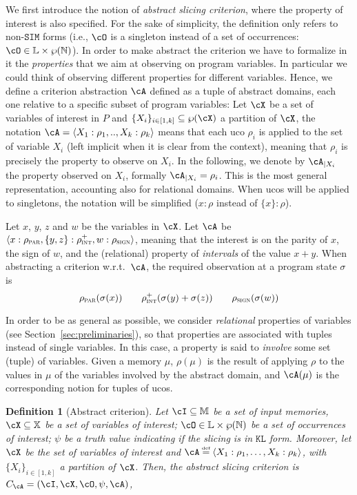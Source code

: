 \documentclass[prodmode,acmtocl]{acmsmall}
\newcommand{\caX}{\cX}
\def\prog{\ensuremath{P}\xspace}
\def\state{\ensuremath{\sigma}\xspace}
\def\variables{\ensuremath{\mathbb{X}}\xspace}
\def\memory{\ensuremath{\mu}\xspace}
\def\memories{\ensuremath{\mathbb{M}}\xspace}
\def\lnums{\ensuremath{\mathbb{L}}\xspace}
\def\crit{\ensuremath{C}\xspace}
\def\uco{\ensuremath{\rho}\xspace}
\def\KL{\ensuremath{\mathtt{KL}}\xspace}
\def\SIM{\ensuremath{\mathtt{SIM}}\xspace}
\def\defi{\mbox{\raisebox{0ex}[1ex][1ex]{$\stackrel{\mbox{\tiny
def}}{\; =\;}$}}}
\def\tuple#1{\langle #1 \rangle}
\newcommand{\0}{\mbox{\bf 0}}
\newtheorem{mydefinition}[theorem]{Definition}
\def\NATURALS{\mathbb{N}}
\def\PARDOM{\ensuremath{\uco_{\textsc{par}}}\xspace}
\def\INTDOM{\ensuremath{\uco_{\textsc{int}}}\xspace}
\def\SIGNDOM{\ensuremath{\uco_{\textsc{sign}}}\xspace}
\begin{document}
We first introduce the notion of \emph{abstract slicing criterion},
where the property of interest is also specified.  For the sake of
simplicity, the definition only refers to non-$\SIM$ forms (i.e.,
$\cO$ is a singleton instead of a set of occurrences: $\cO \in \lnums
\times \wp(\NATURALS)$). In order to make abstract the criterion we
have to formalize in it the {\em properties} that we aim at observing
on program variables. In particular we could think of observing
different properties for different variables.  Hence, we define a
criterion abstraction $\cA$ defined as a tuple of abstract domains,
each one relative to a specific subset of program variables: Let $\cX$
be a set of variables of interest in $\prog$ and
$\{X_i\}_{i\in[1,k]}\subseteq\wp(\cX)$
a partition of $\cX$, the notation $\cA = \tuple{X_1: \uco_1,..,X_k:
  \uco_k}$ means that each uco $\uco_i$ is applied to the set of
variable $X_i$ (left implicit when it is clear from the context),
meaning that $\uco_i$ is precisely the property to observe on
$X_i$. In the following, we denote by $\cA_{|X_i}$ the property
observed on $X_i$, formally $\cA_{|X_i}=\uco_i$.
This is the most general representation, accounting also for
relational domains. When ucos will be applied to singletons, the
notation will be simplified ($x:\uco$ instead of $\{x\}:\uco$).

\begin{example}
  Let $x$, $y$, $z$ and $w$ be the variables in $\cX$.  Let $\cA$ be
  $\tuple{x:\PARDOM,\{y,z\}:\INTDOM^+,w:\SIGNDOM}$, meaning that the
  interest is on the parity of $x$, the sign of $w$, and the
  (relational) property of \emph{intervals} \cite{CC79} of the value
  $x+y$.  When abstracting a criterion w.r.t.~$\cA$, the required
  observation at a program state $\state$ is
  \[\PARDOM(\state(x)) \qquad 
  \INTDOM^+(\state(y)+\state(z)) \qquad \SIGNDOM(\state(w)) \]
\end{example}

In order to be as general as possible, we consider \emph{relational}
properties of variables (see Section~\ref{sec:preliminaries}), so that
properties are associated with tuples instead of single variables.  In
this case, a property is said to \emph{involve} some set (tuple) of
variables.  Given a memory $\memory$, $\uco(\memory)$ is the result of
applying $\uco$ to the values in $\memory$ of the variables involved
by the abstract domain, and $\cA(\memory)$ is the corresponding notion
for tuples of ucos.

\begin{mydefinition}[Abstract criterion]
  \label{def:AbstractCriteria} Let $\cI \subseteq \memories$ be a set
  of input memories, $\cX \subseteq \variables$ be a set of variables
  of interest; $\cO \in \lnums \times \wp(\NATURALS)$ be a set of
  occurrences of interest; $\psi$ be a truth value indicating if the
  slicing is in $\KL$ form.  Moreover, let $\cX$ be the set of
  variables of interest and $\cA \defi \tuple{X_1:\uco_1, \ldots,
    X_k:\uco_k}$, with $\{X_i\}_{i\in[1,k]}$ a partition of $\cX$.
  Then, the \emph{abstract slicing criterion} is $\crit_\cA =
  (\cI, \caX, \cO, \psi, \cA)$, 
\end{mydefinition}
\end{document}
